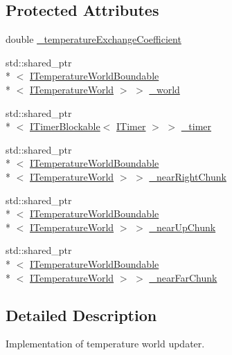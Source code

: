 \subsection*{Protected Attributes}
\begin{DoxyCompactItemize}
\item 
double \hyperlink{class_average_share_temperature_world_updater_a37ebe90d538e148a8da4efa0845d334c}{\-\_\-temperature\-Exchange\-Coefficient}
\item 
std\-::shared\-\_\-ptr\\*
$<$ \hyperlink{class_i_temperature_world_boundable}{I\-Temperature\-World\-Boundable}\\*
$<$ \hyperlink{class_i_temperature_world}{I\-Temperature\-World} $>$ $>$ \hyperlink{class_average_share_temperature_world_updater_a7327a9c0043f7fd278edcc1e7b7ecf78}{\-\_\-world}
\item 
std\-::shared\-\_\-ptr\\*
$<$ \hyperlink{class_i_timer_blockable}{I\-Timer\-Blockable}$<$ \hyperlink{class_i_timer}{I\-Timer} $>$ $>$ \hyperlink{class_average_share_temperature_world_updater_acc17234a8b1f33e1be9c7806e4973be3}{\-\_\-timer}
\item 
std\-::shared\-\_\-ptr\\*
$<$ \hyperlink{class_i_temperature_world_boundable}{I\-Temperature\-World\-Boundable}\\*
$<$ \hyperlink{class_i_temperature_world}{I\-Temperature\-World} $>$ $>$ \hyperlink{class_average_share_temperature_world_updater_a1e5e2936bb7b6613a27129a2a199247d}{\-\_\-near\-Right\-Chunk}
\item 
std\-::shared\-\_\-ptr\\*
$<$ \hyperlink{class_i_temperature_world_boundable}{I\-Temperature\-World\-Boundable}\\*
$<$ \hyperlink{class_i_temperature_world}{I\-Temperature\-World} $>$ $>$ \hyperlink{class_average_share_temperature_world_updater_a33ced05d90444ec05a0fc531d9c1fa7f}{\-\_\-near\-Up\-Chunk}
\item 
std\-::shared\-\_\-ptr\\*
$<$ \hyperlink{class_i_temperature_world_boundable}{I\-Temperature\-World\-Boundable}\\*
$<$ \hyperlink{class_i_temperature_world}{I\-Temperature\-World} $>$ $>$ \hyperlink{class_average_share_temperature_world_updater_a0164e9a5b9b614a3fb6fc360d4c0864a}{\-\_\-near\-Far\-Chunk}
\end{DoxyCompactItemize}


\subsection{Detailed Description}
Implementation of temperature world updater.

